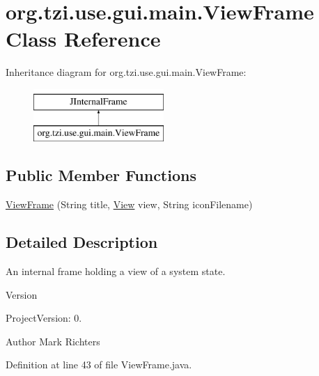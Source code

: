 \hypertarget{classorg_1_1tzi_1_1use_1_1gui_1_1main_1_1_view_frame}{\section{org.\-tzi.\-use.\-gui.\-main.\-View\-Frame Class Reference}
\label{classorg_1_1tzi_1_1use_1_1gui_1_1main_1_1_view_frame}
}
Inheritance diagram for org.\-tzi.\-use.\-gui.\-main.\-View\-Frame\-:\begin{figure}[H]
\begin{center}
\leavevmode
\includegraphics[height=2.000000cm]{classorg_1_1tzi_1_1use_1_1gui_1_1main_1_1_view_frame}
\end{center}
\end{figure}
\subsection*{Public Member Functions}
\begin{DoxyCompactItemize}
\item 
\hyperlink{classorg_1_1tzi_1_1use_1_1gui_1_1main_1_1_view_frame_a0241828d3dedada91877e89961819e21}{View\-Frame} (String title, \hyperlink{interfaceorg_1_1tzi_1_1use_1_1gui_1_1views_1_1_view}{View} view, String icon\-Filename)
\end{DoxyCompactItemize}


\subsection{Detailed Description}
An internal frame holding a view of a system state.

\begin{DoxyVersion}{Version}

\end{DoxyVersion}
\begin{DoxyParagraph}{Project\-Version\-:}
0. 
\end{DoxyParagraph}
\begin{DoxyAuthor}{Author}
Mark Richters 
\end{DoxyAuthor}


Definition at line 43 of file View\-Frame.\-java.



